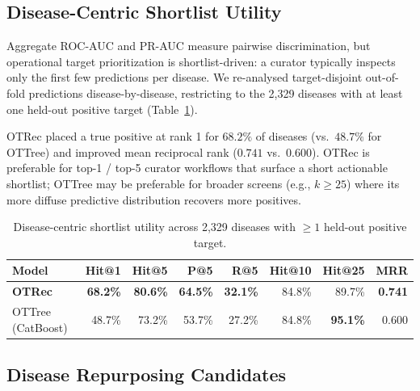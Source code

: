 \documentclass{article}
\begin{document}
\subsection{Disease-Centric Shortlist Utility}

Aggregate ROC-AUC and PR-AUC measure pairwise discrimination, but
operational target prioritization is shortlist-driven: a curator
typically inspects only the first few predictions per disease.
We re-analysed target-disjoint out-of-fold predictions
disease-by-disease, restricting to the 2{,}329 diseases with at least
one held-out positive target (Table~\ref{tab:shortlist}).

OTRec placed a true positive at rank 1 for $68.2\%$ of diseases
(vs.\ $48.7\%$ for OTTree) and improved mean reciprocal rank
($0.741$ vs.\ $0.600$).
OTRec is preferable for top-1 / top-5 curator workflows that surface a
short actionable shortlist; OTTree may be preferable for broader screens
(e.g., $k{\geq}25$) where its more diffuse predictive distribution
recovers more positives.

\begin{table}[ht]
\caption{Disease-centric shortlist utility across 2{,}329 diseases with
${\geq}1$ held-out positive target.}
\label{tab:shortlist}
\centering\small
\begin{tabular}{@{}lrrrrrrr@{}}
\toprule
Model & Hit@1 & Hit@5 & P@5 & R@5 & Hit@10 & Hit@25 & MRR \\
\midrule
\textbf{OTRec}     & \textbf{68.2\%} & \textbf{80.6\%} & \textbf{64.5\%} & \textbf{32.1\%} & 84.8\% & 89.7\%          & \textbf{0.741} \\
OTTree (CatBoost)  & 48.7\%          & 73.2\%          & 53.7\%          & 27.2\%          & 84.8\% & \textbf{95.1\%} & 0.600 \\
\bottomrule
\end{tabular}
\end{table}

\subsection{Disease Repurposing Candidates}
\end{document}
